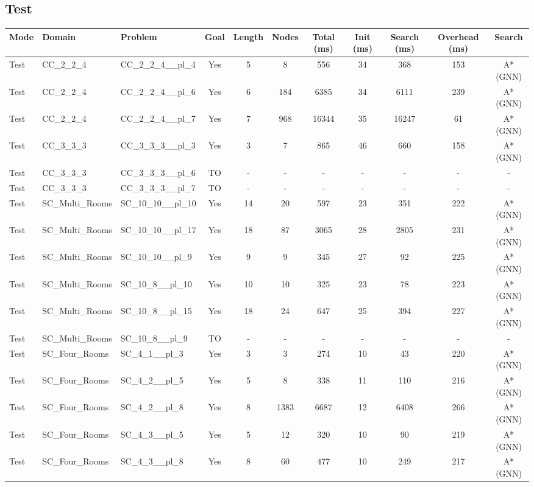 \documentclass{article}
\begin{document}
\subsection*{Test}
\begin{tabular}{lllcccccccc}
\toprule
Mode & Domain & Problem & Goal & Length & Nodes & Total (ms) & Init (ms) & Search (ms) & Overhead (ms) & Search \\
\midrule
Test & CC\_2\_2\_4 & CC\_2\_2\_4\_\_pl\_4 & Yes & 5 & 8 & 556 & 34 & 368 & 153 & A*(GNN) \\
Test & CC\_2\_2\_4 & CC\_2\_2\_4\_\_pl\_6 & Yes & 6 & 184 & 6385 & 34 & 6111 & 239 & A*(GNN) \\
Test & CC\_2\_2\_4 & CC\_2\_2\_4\_\_pl\_7 & Yes & 7 & 968 & 16344 & 35 & 16247 & 61 & A*(GNN) \\
Test & CC\_3\_3\_3 & CC\_3\_3\_3\_\_pl\_3 & Yes & 3 & 7 & 865 & 46 & 660 & 158 & A*(GNN) \\
Test & CC\_3\_3\_3 & CC\_3\_3\_3\_\_pl\_6 & TO & - & - & - & - & - & - & - \\
Test & CC\_3\_3\_3 & CC\_3\_3\_3\_\_pl\_7 & TO & - & - & - & - & - & - & - \\
Test & SC\_Multi\_Rooms & SC\_10\_10\_\_pl\_10 & Yes & 14 & 20 & 597 & 23 & 351 & 222 & A*(GNN) \\
Test & SC\_Multi\_Rooms & SC\_10\_10\_\_pl\_17 & Yes & 18 & 87 & 3065 & 28 & 2805 & 231 & A*(GNN) \\
Test & SC\_Multi\_Rooms & SC\_10\_10\_\_pl\_9 & Yes & 9 & 9 & 345 & 27 & 92 & 225 & A*(GNN) \\
Test & SC\_Multi\_Rooms & SC\_10\_8\_\_pl\_10 & Yes & 10 & 10 & 325 & 23 & 78 & 223 & A*(GNN) \\
Test & SC\_Multi\_Rooms & SC\_10\_8\_\_pl\_15 & Yes & 18 & 24 & 647 & 25 & 394 & 227 & A*(GNN) \\
Test & SC\_Multi\_Rooms & SC\_10\_8\_\_pl\_9 & TO & - & - & - & - & - & - & - \\
Test & SC\_Four\_Rooms & SC\_4\_1\_\_pl\_3 & Yes & 3 & 3 & 274 & 10 & 43 & 220 & A*(GNN) \\
Test & SC\_Four\_Rooms & SC\_4\_2\_\_pl\_5 & Yes & 5 & 8 & 338 & 11 & 110 & 216 & A*(GNN) \\
Test & SC\_Four\_Rooms & SC\_4\_2\_\_pl\_8 & Yes & 8 & 1383 & 6687 & 12 & 6408 & 266 & A*(GNN) \\
Test & SC\_Four\_Rooms & SC\_4\_3\_\_pl\_5 & Yes & 5 & 12 & 320 & 10 & 90 & 219 & A*(GNN) \\
Test & SC\_Four\_Rooms & SC\_4\_3\_\_pl\_8 & Yes & 8 & 60 & 477 & 10 & 249 & 217 & A*(GNN) \\

\end{tabular}
\end{document}
